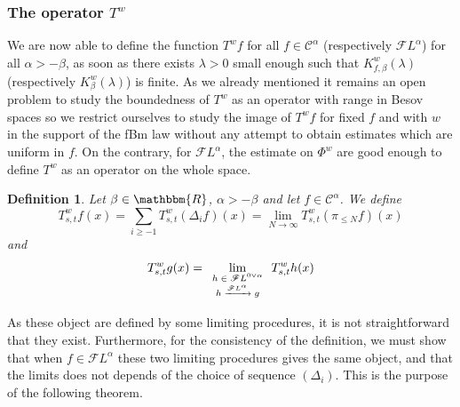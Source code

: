 \documentclass[a4paper,11pt]{article}
\newcommand{\tmscript}[1]{\text{\scriptsize{$#1$}}}
\newtheorem{definition}[theorem]{Definition}
\newcommand{\CC}{\mathscr C}
\newcommand{\CF}{\mathscr F}
\begin{document}
\subsubsection{The operator $T^{w}$}
\label{sec:bounds-on-Tw}

We are now able to define the function $T^{w} f$ for all $f \in \CC^{\alpha}$
(respectively $\CF L^{\alpha}$) for all $\alpha >- \beta$, as soon as there
exists $\lambda >0$ small enough such that $K^{w}_{f, \beta} ( \lambda )$
(respectively $K^{w}_{\beta} ( \lambda )$) is finite. As we already mentioned
it remains an open problem to study the boundedness of $T^{w}$ as an operator
with range in Besov spaces so we restrict ourselves to study the image of
$T^{w} f$ for fixed $f$ and with $w$ in the support of the fBm law without any
attempt to obtain estimates which are uniform in $f$. On the contrary, for
$\CF L^{\alpha}$, the estimate on $\Phi^{w}$ are good enough to define $T^{w}$
as an operator on the whole space.

\begin{definition}
  Let $\beta \in \mathbbm{R}$, $\alpha >- \beta$ and let $f \in \CC^{\alpha}$.
  We define
  \[ T^{w}_{s,t} f ( x ) = \sum_{i \geqslant -1} T^{w}_{s,t} ( \Delta_{i} f )
     ( x )  =  \lim_{N \rightarrow \infty} T^{w}_{s,t} ( \pi_{\leqslant N} f )
     ( x ) \]
  and
  \[ T^{w}_{s,t} g ( x ) = \lim_{\tmscript{\begin{array}{c}
       h \in \CF L^{0 \vee \alpha}\\
       h \xrightarrow{\CF L^{\alpha}} g
     \end{array}}} T^{w}_{s,t} h ( x ) \]
\end{definition}

As these object are defined by some limiting procedures, it is not
straightforward that they exist. Furthermore, for the consistency of the
definition, we must show that when $f \in \CF L^{\alpha}$ these two limiting
procedures gives the same object, and that the limits does not depends of the
choice of sequence $( \Delta_{i} )$. This is the purpose of the following
theorem.
\end{document}
